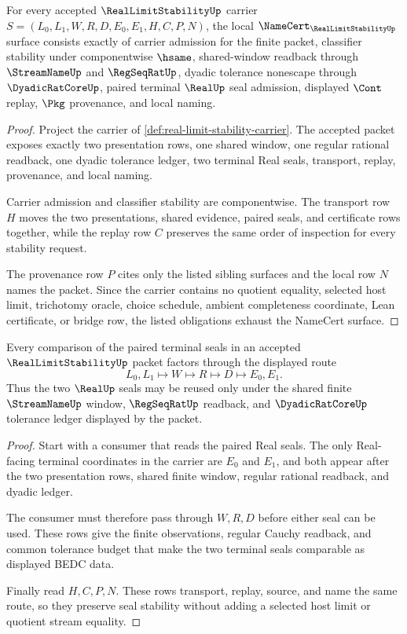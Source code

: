 \begin{theorem}
\label{thm:real-limit-stability-namecert-obligations}
For every accepted $\RealLimitStabilityUp$ carrier $S=(L_0,L_1,W,R,D,E_0,E_1,H,C,P,N)$, the local $\NameCert_{\RealLimitStabilityUp}$ surface consists exactly of carrier admission for the finite packet, classifier stability under componentwise $\hsame$, shared-window readback through $\StreamNameUp$ and $\RegSeqRatUp$, dyadic tolerance nonescape through $\DyadicRatCoreUp$, paired terminal $\RealUp$ seal admission, displayed $\Cont$ replay, $\Pkg$ provenance, and local naming.
\end{theorem}
\begin{proof}
Project the carrier of \autoref{def:real-limit-stability-carrier}. The accepted packet exposes exactly two presentation rows, one shared window, one regular rational readback, one dyadic tolerance ledger, two terminal Real seals, transport, replay, provenance, and local naming.

Carrier admission and classifier stability are componentwise. The transport row $H$ moves the two presentations, shared evidence, paired seals, and certificate rows together, while the replay row $C$ preserves the same order of inspection for every stability request.

The provenance row $P$ cites only the listed sibling surfaces and the local row $N$ names the packet. Since the carrier contains no quotient equality, selected host limit, trichotomy oracle, choice schedule, ambient completeness coordinate, Lean certificate, or bridge row, the listed obligations exhaust the NameCert surface.
\end{proof}

\begin{theorem}
\label{thm:real-limit-stability-seal-stability}
Every comparison of the paired terminal seals in an accepted $\RealLimitStabilityUp$ packet factors through the displayed route
$$
L_0,L_1 \longmapsto W \longmapsto R \longmapsto D \longmapsto E_0,E_1 .
$$
Thus the two $\RealUp$ seals may be reused only under the shared finite $\StreamNameUp$ window, $\RegSeqRatUp$ readback, and $\DyadicRatCoreUp$ tolerance ledger displayed by the packet.
\end{theorem}
\begin{proof}
Start with a consumer that reads the paired Real seals. The only Real-facing terminal coordinates in the carrier are $E_0$ and $E_1$, and both appear after the two presentation rows, shared finite window, regular rational readback, and dyadic ledger.

The consumer must therefore pass through $W,R,D$ before either seal can be used. These rows give the finite observations, regular Cauchy readback, and common tolerance budget that make the two terminal seals comparable as displayed BEDC data.

Finally read $H,C,P,N$. These rows transport, replay, source, and name the same route, so they preserve seal stability without adding a selected host limit or quotient stream equality.
\end{proof}

